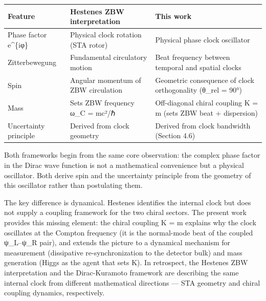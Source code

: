 \documentclass[
]{article}
\newcounter{none} %
\begin{document}
{\def\LTcaptype{none} %
\begin{longtable}[]{@{}
  >{\raggedright\arraybackslash}p{}
  >{\raggedright\arraybackslash}p{}
  >{\raggedright\arraybackslash}p{}@{}}
\toprule\noalign{}
\begin{minipage}[b]{\linewidth}\raggedright
Feature
\end{minipage} & \begin{minipage}[b]{\linewidth}\raggedright
Hestenes ZBW interpretation
\end{minipage} & \begin{minipage}[b]{\linewidth}\raggedright
This work
\end{minipage} \\
\midrule\noalign{}
\endhead
\bottomrule\noalign{}
\endlastfoot
Phase factor e\^{}\{iφ\} & Physical clock rotation (STA rotor) &
Physical phase clock oscillator \\
Zitterbewegung & Fundamental circulatory motion & Beat frequency between
temporal and spatial clocks \\
Spin & Angular momentum of ZBW circulation & Geometric consequence of
clock orthogonality (θ\_rel = 90°) \\
Mass & Sets ZBW frequency ω\_C = mc²/ℏ & Off-diagonal chiral coupling K
= m (sets ZBW beat + dispersion) \\
Uncertainty principle & Derived from clock geometry & Derived from clock
bandwidth (Section 4.6) \\
\end{longtable}
}

Both frameworks begin from the same core observation: the complex phase
factor in the Dirac wave function is not a mathematical convenience but
a physical oscillator. Both derive spin and the uncertainty principle
from the geometry of this oscillator rather than postulating them.

The key difference is dynamical. Hestenes identifies the internal clock
but does not supply a coupling framework for the two chiral sectors. The
present work provides this missing element: the chiral coupling K = m
explains why the clock oscillates at the Compton frequency (it is the
normal-mode beat of the coupled ψ\_L--ψ\_R pair), and extends the
picture to a dynamical mechanism for measurement (dissipative
re-synchronization to the detector bulk) and mass generation (Higgs as
the agent that sets K). In retrospect, the Hestenes ZBW interpretation
and the Dirac-Kuramoto framework are describing the same internal clock
from different mathematical directions --- STA geometry and chiral
coupling dynamics, respectively.
\end{document}
